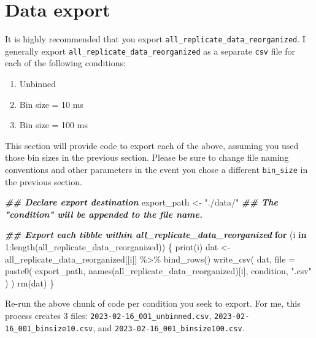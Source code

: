 \documentclass[
]{book}
\newenvironment{Shaded}{\begin{snugshade}}{\end{snugshade}}
\newcommand{\AttributeTok}[1]{\textcolor[rgb]{0.77,0.63,0.00}{#1}}
\newcommand{\ControlFlowTok}[1]{\textcolor[rgb]{0.13,0.29,0.53}{\textbf{#1}}}
\newcommand{\DecValTok}[1]{\textcolor[rgb]{0.00,0.00,0.81}{#1}}
\newcommand{\DocumentationTok}[1]{\textcolor[rgb]{0.56,0.35,0.01}{\textbf{\textit{#1}}}}
\newcommand{\FunctionTok}[1]{\textcolor[rgb]{0.00,0.00,0.00}{#1}}
\newcommand{\NormalTok}[1]{#1}
\newcommand{\OtherTok}[1]{\textcolor[rgb]{0.56,0.35,0.01}{#1}}
\newcommand{\SpecialCharTok}[1]{\textcolor[rgb]{0.00,0.00,0.00}{#1}}
\newcommand{\StringTok}[1]{\textcolor[rgb]{0.31,0.60,0.02}{#1}}
\providecommand{\tightlist}{%
  \setlength{\itemsep}{0pt}\setlength{\parskip}{0pt}}
\begin{document}
\hypertarget{data-export}{%
\section{Data export}\label{data-export}}

It is highly recommended that you export
\texttt{all\_replicate\_data\_reorganized}. I generally export
\texttt{all\_replicate\_data\_reorganized} as a separate \texttt{csv} file for each of
the following conditions:

\begin{enumerate}
\def\labelenumi{\arabic{enumi}.}
\tightlist
\item
  Unbinned
\item
  Bin size = 10 ms
\item
  Bin size = 100 ms
\end{enumerate}

This section will provide code to export each of the above, assuming
you used those bin sizes in the previous section. Please be sure to
change file naming conventions and other parameters in the event you
chose a different \texttt{bin\_size} in the previous section.

\begin{Shaded}
\begin{Highlighting}[]
\DocumentationTok{\#\# Declare export destination}
\NormalTok{export\_path }\OtherTok{\textless{}{-}} \StringTok{"./data/"}
\DocumentationTok{\#\# The "condition" will be appended to the file name.}

\DocumentationTok{\#\# Export each tibble within all\_replicate\_data\_reorganized}
\ControlFlowTok{for}\NormalTok{ (i }\ControlFlowTok{in} \DecValTok{1}\SpecialCharTok{:}\FunctionTok{length}\NormalTok{(all\_replicate\_data\_reorganized)) \{}
  \FunctionTok{print}\NormalTok{(i)}
\NormalTok{  dat }\OtherTok{\textless{}{-}}
\NormalTok{    all\_replicate\_data\_reorganized[[i]] }\SpecialCharTok{\%\textgreater{}\%}
    \FunctionTok{bind\_rows}\NormalTok{()}
  \FunctionTok{write\_csv}\NormalTok{(}
\NormalTok{    dat,}
    \AttributeTok{file =}
      \FunctionTok{paste0}\NormalTok{(}
\NormalTok{        export\_path,}
        \FunctionTok{names}\NormalTok{(all\_replicate\_data\_reorganized)[i],}
\NormalTok{        condition,}
        \StringTok{".csv"}
\NormalTok{      )}
\NormalTok{  )}
  \FunctionTok{rm}\NormalTok{(dat)}
\NormalTok{\}}
\end{Highlighting}
\end{Shaded}

Re-run the above chunk of code per condition you seek to export. For me, this
process creates 3 files: \texttt{2023-02-16\_001\_unbinned.csv},
\texttt{2023-02-16\_001\_binsize10.csv}, and \texttt{2023-02-16\_001\_binsize100.csv}.
\end{document}
